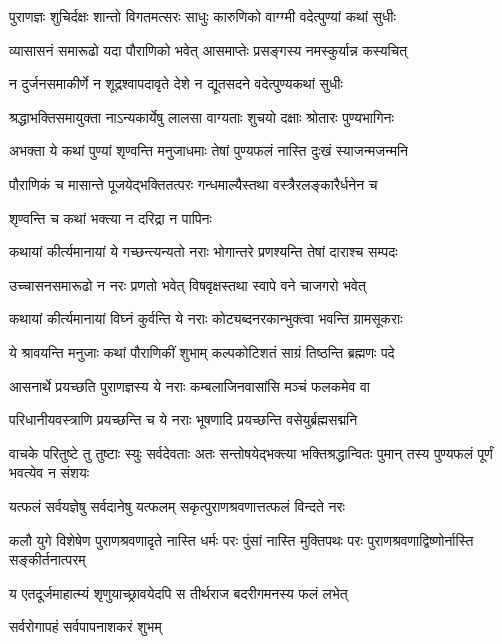 \twolineshloka
{पुराणज्ञः शुचिर्दक्षः शान्तो विगतमत्सरः}
{साधुः कारुणिको वाग्ग्मी वदेत्पुण्यां कथां सुधीः} %

\twolineshloka
{व्यासासनं समारूढो यदा पौराणिको भवेत्}
{आसमाप्तेः प्रसङ्गस्य नमस्कुर्यान्न कस्यचित्} %

\twolineshloka
{न दुर्जनसमाकीर्णे न शूद्रश्वापदावृते}
{देशे न द्यूतसदने वदेत्पुण्यकथां सुधीः} %

\twolineshloka
{श्रद्धाभक्तिसमायुक्ता नाऽन्यकार्येषु लालसा}
{वाग्यताः शुचयो दक्षाः श्रोतारः पुण्यभागिनः} %

\twolineshloka
{अभक्ता ये कथां पुण्यां शृण्वन्ति मनुजाधमाः}
{तेषां पुण्यफलं नास्ति दुःखं स्याजन्मजन्मनि} %

\twolineshloka
{पौराणिकं च मासान्ते पूजयेद्भक्तितत्परः}
{गन्धमाल्यैस्तथा वस्त्रैरलङ्कारैर्धनेन च} %


\onelineshloka
{शृण्वन्ति च कथां भक्त्या न दरिद्रा न पापिनः} %

\twolineshloka
{कथायां कीर्त्यमानायां ये गच्छन्त्यन्यतो नराः}
{भोगान्तरे प्रणश्यन्ति तेषां दाराश्च सम्पदः} %

\twolineshloka
{उच्चासनसमारूढो न नरः प्रणतो भवेत्}
{विषवृक्षस्तथा स्वापे वने चाजगरो भवेत्} %

\twolineshloka
{कथायां कीर्त्यमानायां विघ्नं कुर्वन्ति ये नराः}
{कोट्यब्दनरकान्भुक्त्वा भवन्ति ग्रामसूकराः} %

\twolineshloka
{ये श्रावयन्ति मनुजाः कथां पौराणिकीं शुभाम्}
{कल्पकोटिशतं साग्रं तिष्ठन्ति ब्रह्मणः पदे} %

\twolineshloka
{आसनार्थे प्रयच्छति पुराणज्ञस्य ये नराः}
{कम्बलाजिनवासांसि मञ्चं फलकमेव वा} %

\twolineshloka
{परिधानीयवस्त्राणि प्रयच्छन्ति च ये नराः}
{भूषणादि प्रयच्छन्ति वसेयुर्ब्रह्मसद्मनि} %

\threelineshloka
{वाचके परितुष्टे तु तुष्टाः स्युः सर्वदेवताः}
{अतः सन्तोषयेद्भक्त्या भक्तिश्रद्धान्वितः पुमान्}
{तस्य पुण्यफलं पूर्णं भवत्येव न संशयः} %

\twolineshloka
{यत्फलं सर्वयज्ञेषु सर्वदानेषु यत्फलम्}
{सकृत्पुराणश्रवणात्तत्फलं विन्दते नरः} %

\threelineshloka
{कलौ युगे विशेषेण पुराणश्रवणादृते}
{नास्ति धर्मः परः पुंसां नास्ति मुक्तिपथः परः}
{पुराणश्रवणाद्विष्णोर्नास्ति सङ्कीर्तनात्परम्} %

\twolineshloka
{य एतदूर्जमाहात्म्यं शृणुयाच्छ्रावयेदपि}
{स तीर्थराज बदरीगमनस्य फलं लभेत्} %


\onelineshloka
{सर्वरोगापहं सर्वपापनाशकरं शुभम्} %

